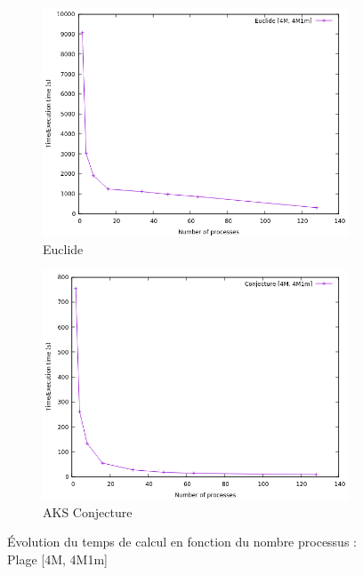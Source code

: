 \begin{figure}
        \centering
        \begin{subfigure}[b]{0.85\textwidth}
            \centering
            \includegraphics[width=\textwidth]{Euclide_4M.png}
            \caption[Network2]%
            {{\small Euclide}}    
            \label{fig:sub4}
        \end{subfigure}
        \hfill
        \begin{subfigure}[b]{0.85\textwidth}  
            \centering 
            \includegraphics[width=\textwidth]{Conjecture_4M.png}
            \caption[]%
            {{\small AKS Conjecture}}    
            \label{fig:sub5}
        \end{subfigure}
         \caption[ Évolution du temps de calcul en fonction du nombre processus]
        {\small Évolution du temps de calcul en fonction du nombre processus : Plage [4M, 4M1m]} 
        \label{fig:4}
\end{figure}
